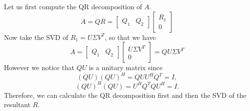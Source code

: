 \documentclass{homework}
\begin{document}
\begin{solution}
  Let us first compute the QR decomposition of $A$.  
  \[ A = QR = 
    \begin{bmatrix}
      Q_1 & Q_2
    \end{bmatrix}
    \begin{bmatrix}
      R_1 \\
      0
    \end{bmatrix}
  \]
  Now take the SVD of $R_1 = U\Sigma V^T$, so that we have
  \[ A = 
    \begin{bmatrix}
      Q_1 & Q_2
    \end{bmatrix}
    \begin{bmatrix}
      U\Sigma V^T \\
      0
    \end{bmatrix}
     = QU\Sigma V^T
   \]
   However we notice that $QU$ is a unitary matrix since 
   \[(QU)(QU)^H = QUU^HQ^T = I,\]
   \[(QU)^H(QU) = U^HQ^TQU^H = I.\]
   Therefore, we can calculate the QR decomposition first and then the SVD of the resultant $R$.
\end{solution}
\end{document}
